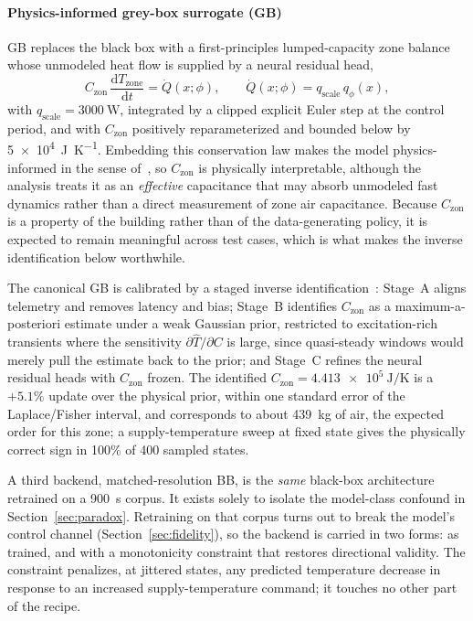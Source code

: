 \documentclass{ieeeaccess}
\newcommand{\Czon}{\ensuremath{C_{\mathrm{zon}}}}
\begin{document}
\paragraph{Physics-informed grey-box surrogate (GB)}
GB replaces the black box with a first-principles lumped-capacity zone balance whose unmodeled heat
flow is supplied by a neural residual head,
\begin{equation}
\Czon\,\frac{\mathrm{d}T_{\mathrm{zone}}}{\mathrm{d}t}=\dot{Q}(x;\phi),
\qquad \dot{Q}(x;\phi)=q_{\mathrm{scale}}\,q_\phi(x),
\label{eq:rc}
\end{equation}
with $q_{\mathrm{scale}}=\SI{3000}{\watt}$, integrated by a clipped explicit Euler step at the
control period, and with \Czon{} positively reparameterized and bounded below by
\SI{5e4}{\joule\per\kelvin}. Embedding this conservation law makes the model physics-informed in the
sense of~\cite{Raissi2019PINN,Karpatne2017TheoryGuided,Willard2022PIML,Hedayat2025PINN}, so \Czon{}
is physically interpretable, although the analysis treats it as an \emph{effective} capacitance that
may absorb unmodeled fast dynamics rather than a direct measurement of zone air capacitance. Because
\Czon{} is a property of the building rather than of the data-generating policy, it is expected to
remain meaningful across test cases, which is what makes the inverse identification below
worthwhile.

The canonical GB is calibrated by a staged inverse
identification~\cite{Bacher2011RCIdentification}: Stage~A aligns telemetry and removes latency and
bias; Stage~B identifies \Czon{} as a maximum-a-posteriori estimate under a weak Gaussian prior,
restricted to excitation-rich transients where the sensitivity $\partial\widehat{T}/\partial C$ is
large, since quasi-steady windows would merely pull the estimate back to the prior; and Stage~C
refines the neural residual heads with \Czon{} frozen. The identified
$\Czon=\SI{4.413e5}{\joule\per\kelvin}$ is a $+5.1\%$ update over the physical prior, within one
standard error of the Laplace/Fisher interval, and corresponds to about \SI{439}{\kilogram} of air,
the expected order for this zone; a supply-temperature sweep at fixed state gives the physically
correct sign in 100\% of 400 sampled states.

A third backend, matched-resolution BB, is the \emph{same} black-box architecture retrained on a
\SI{900}{\second} corpus. It exists solely to isolate the model-class confound in
Section~\ref{sec:paradox}. Retraining on that corpus turns out to break the model's control channel
(Section~\ref{sec:fidelity}), so the backend is carried in two forms: as trained, and with a
monotonicity constraint that restores directional validity. The constraint penalizes, at jittered
states, any predicted temperature decrease in response to an increased supply-temperature command;
it touches no other part of the recipe.
\end{document}
